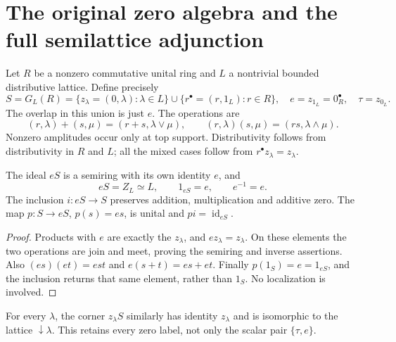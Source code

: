 \documentclass[11pt,a4paper]{article}
\theoremstyle{definition}\newtheorem{definition}[theorem]{Definition}\newtheorem{remark}[theorem]{Remark}
\begin{document}
\section{The original zero algebra and the full semilattice adjunction}
Let $R$ be a nonzero commutative unital ring and $L$ a nontrivial bounded distributive lattice. Define precisely
\begin{equation}
 S=G_L(R)=\{z_\lambda=(0,\lambda):\lambda\in L\}
 \cup\{r^\bullet=(r,1_L):r\in R\},\quad
 e=z_{1_L}=0_R^\bullet,\quad\tau=z_{0_L}.                 \label{eq:base}
\end{equation}
The overlap in this union is just $e$. The operations are
\begin{equation}
 (r,\lambda)+(s,\mu)=(r+s,\lambda\vee\mu),\qquad
 (r,\lambda)(s,\mu)=(rs,\lambda\wedge\mu).               \label{eq:ops}
\end{equation}
Nonzero amplitudes occur only at top support. Distributivity follows from distributivity in $R$ and $L$; all the mixed cases follow from $r^\bullet z_\lambda=z_\lambda$.

\begin{proposition}
The ideal $eS$ is a semiring with its own identity $e$, and
\begin{equation}
 eS=Z_L\simeq L,\qquad 1_{eS}=e,\qquad e^{-1}=e.
                                                        \label{eq:inverse}
\end{equation}
The inclusion $i:eS\to S$ preserves addition, multiplication and additive zero. The map $p:S\to eS$, $p(s)=es$, is unital and $pi=\operatorname{id}_{eS}$.
\end{proposition}
\begin{proof}
Products with $e$ are exactly the $z_\lambda$, and $ez_\lambda=z_\lambda$. On these elements the two operations are join and meet, proving the semiring and inverse assertions. Also $(es)(et)=est$ and $e(s+t)=es+et$. Finally $p(1_S)=e=1_{eS}$, and the inclusion returns that same element, rather than $1_S$. No localization is involved.
\end{proof}
For every $\lambda$, the corner $z_\lambda S$ similarly has identity $z_\lambda$ and is isomorphic to the lattice $\downarrow\lambda$. This retains every zero label, not only the scalar pair $\{\tau,e\}$.
\end{document}
